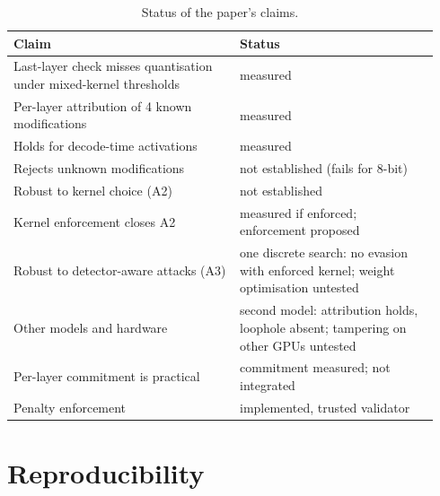\documentclass[11pt]{article}
\begin{document}
\begin{table}[!htb]
\centering
\small
\caption{Status of the paper's claims.}
\label{tab:status}
\begin{tabular}{@{}>{\raggedright\arraybackslash}p{0.5\linewidth}>{\raggedright\arraybackslash}p{0.44\linewidth}@{}}
\toprule
Claim & Status \\
\midrule
Last-layer check misses quantisation under mixed-kernel thresholds & measured \\
Per-layer attribution of 4 known modifications & measured \\
Holds for decode-time activations & measured \\
Rejects unknown modifications & not established (fails for 8-bit) \\
Robust to kernel choice (A2) & not established \\
Kernel enforcement closes A2 & measured if enforced; enforcement proposed \\
Robust to detector-aware attacks (A3) & one discrete search: no evasion with enforced kernel; weight optimisation untested \\
Other models and hardware & second model: attribution holds, loophole absent; tampering on other GPUs untested \\
Per-layer commitment is practical & commitment measured; not integrated \\
Penalty enforcement & implemented, trusted validator \\
\bottomrule
\end{tabular}
\end{table}




\appendix
\section{Reproducibility}
\end{document}
